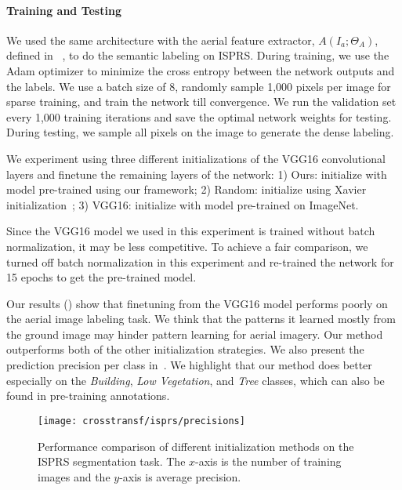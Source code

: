 \paragraph{Training and Testing} We used the same architecture with
the aerial feature extractor, $A(I_a; \Theta_A)$, defined in
~, to do the semantic labeling on ISPRS.  During
training, we use the Adam optimizer to minimize the cross entropy
between the network outputs and the labels.  We use a batch size of 8,
randomly sample 1,000 pixels per image for sparse training, and train
the network till convergence.  We run the validation set every 1,000 training
iterations and save the optimal network weights for testing.  During
testing, we sample all pixels on the image to generate the dense
labeling.

We experiment using three different initializations of the VGG16
convolutional layers and finetune the remaining layers of the network: 
1) Ours: initialize with model pre-trained using our framework;
2) Random: initialize using Xavier 
initialization~\cite{xavier2010understanding}; 
3) VGG16: initialize with model pre-trained on ImageNet.

Since the VGG16 model we used in this experiment is trained without
batch normalization, it may be less competitive. To achieve a fair
comparison, we turned off batch normalization in this experiment and
re-trained the network for 15 epochs to get the pre-trained model.

Our results () show that finetuning from the 
VGG16 model performs poorly on the aerial image labeling task. We
think that the patterns it learned mostly from the ground image may
hinder pattern learning for aerial imagery. Our method outperforms
both of the other initialization strategies.  We also present the prediction
precision per class in~. We highlight that our method
does better especially on the \textit{Building}, \textit{Low Vegetation}, and
\textit{Tree} classes, which can also be found in pre-training
annotations.

\begin{figure}
	\centering
	\texttt{[image: crosstransf/isprs/precisions]}

  \caption{Performance comparison of different initialization methods
  on the ISPRS segmentation task. The $x$-axis is the number of
training images and the $y$-axis is average precision.}

	\label{fig:isprs:precisions}
\end{figure}

